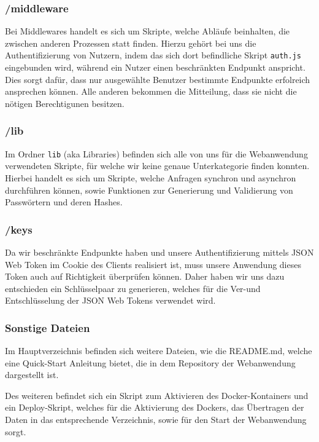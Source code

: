 \subsubsection*{/middleware}
Bei Middlewares handelt es sich um Skripte, welche Abläufe beinhalten, die zwischen anderen Prozessen statt finden. Hierzu gehört bei uns die Authentifizierung von Nutzern, indem das sich dort befindliche Skript \verb|auth.js| eingebunden wird, während ein Nutzer einen beschränkten Endpunkt anspricht. Dies sorgt dafür, dass nur ausgewählte Benutzer bestimmte Endpunkte erfolreich ansprechen können. Alle anderen bekommen die Mitteilung, dass sie nicht die nötigen Berechtigunen besitzen.

\subsubsection*{/lib}
Im Ordner \verb|lib| (aka Libraries) befinden sich alle von uns für die Webanwendung verwendeten Skripte, für welche wir keine genaue Unterkategorie finden konnten. Hierbei handelt es sich um Skripte, welche Anfragen synchron und asynchron durchführen können, sowie Funktionen zur Generierung und Validierung von Passwörtern und deren Hashes.

\subsubsection*{/keys}
Da wir beschränkte Endpunkte haben und unsere Authentifizierung mittels JSON Web Token im Cookie des Clients realisiert ist, muss unsere Anwendung dieses Token auch auf Richtigkeit überprüfen können. Daher haben wir uns dazu entschieden ein Schlüsselpaar zu generieren, welches für die Ver-und Entschlüsselung der JSON Web Tokens verwendet wird.\\

\subsubsection*{Sonstige Dateien}
\label{sec:node-other-files}
Im Hauptverzeichnis befinden sich weitere Dateien, wie die README.md, welche eine Quick-Start Anleitung bietet, die in dem Repository der Webanwendung dargestellt ist.

Des weiteren befindet sich ein Skript zum Aktivieren des Docker-Kontainers und ein Deploy-Skript, welches für die Aktivierung des Dockers, das Übertragen der Daten in das entsprechende Verzeichnis, sowie für den Start der Webanwendung sorgt.

